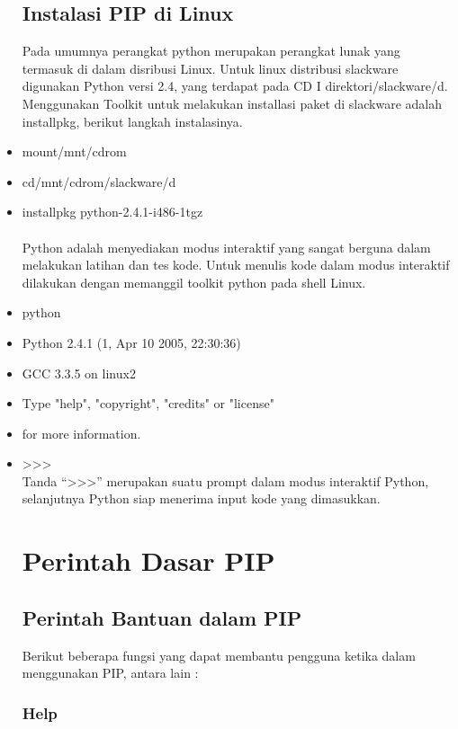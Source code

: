 \begin{itemize}
\subsection{Instalasi PIP di Linux}
Pada umumnya perangkat python merupakan perangkat lunak yang termasuk di dalam disribusi Linux. Untuk linux distribusi slackware digunakan Python versi 2.4, yang terdapat pada CD I direktori/slackware/d. Menggunakan Toolkit untuk melakukan installasi paket di slackware adalah installpkg, berikut langkah instalasinya.\\
\item  mount/mnt/cdrom\\
\item  cd/mnt/cdrom/slackware/d\\
\item  installpkg python-2.4.1-i486-1tgz\\
\\
Python adalah menyediakan modus interaktif yang sangat berguna dalam melakukan latihan dan tes kode. Untuk menulis kode dalam modus interaktif dilakukan dengan memanggil toolkit python pada shell Linux. \\
\item  python\\
\item Python 2.4.1 (1, Apr 10 2005, 22:30:36) \\
\item GCC 3.3.5 on linux2 \\
\item Type "help", "copyright", "credits" or "license" \\
\item for more information.\\
\item  >>>\\
 Tanda “>>>” merupakan suatu prompt dalam modus interaktif Python, selanjutnya Python siap menerima input kode yang dimasukkan.\\

\section{Perintah Dasar PIP}
\subsection{Perintah Bantuan dalam PIP}
Berikut beberapa fungsi yang dapat membantu pengguna ketika dalam menggunakan PIP, antara lain :
\subsubsection{Help}


\end{itemize}
